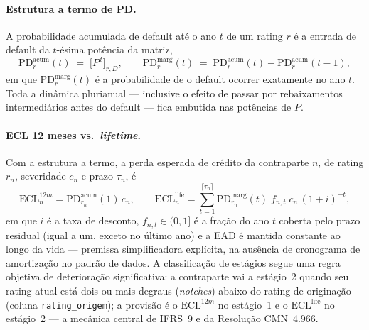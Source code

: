 \documentclass[11pt,a4paper]{article}
\begin{document}
\paragraph{Estrutura a termo de PD.} A probabilidade acumulada de default até o ano $t$ de um rating $r$ é a entrada de default da $t$-ésima potência da matriz,
\begin{equation}
\mathrm{PD}^{\mathrm{acum}}_{r}(t) \;=\; \bigl[P^{\,t}\bigr]_{r,D},
\qquad
\mathrm{PD}^{\mathrm{marg}}_{r}(t) \;=\; \mathrm{PD}^{\mathrm{acum}}_{r}(t)-\mathrm{PD}^{\mathrm{acum}}_{r}(t-1),
\label{eq:pdterm}
\end{equation}
em que $\mathrm{PD}^{\mathrm{marg}}_{r}(t)$ é a probabilidade de o default ocorrer exatamente no ano $t$. Toda a dinâmica plurianual --- inclusive o efeito de passar por rebaixamentos intermediários antes do default --- fica embutida nas potências de $P$.

\paragraph{ECL 12 meses vs.\ \emph{lifetime}.} Com a estrutura a termo, a perda esperada de crédito da contraparte $n$, de rating $r_n$, severidade $c_n$ e prazo $\tau_n$, é
\begin{equation}
\mathrm{ECL}^{12m}_n = \mathrm{PD}^{\mathrm{acum}}_{r_n}(1)\,c_n,
\qquad
\mathrm{ECL}^{\mathrm{life}}_n = \sum_{t=1}^{\lceil \tau_n\rceil} \mathrm{PD}^{\mathrm{marg}}_{r_n}(t)\;f_{n,t}\;c_n\,(1+i)^{-t},
\label{eq:ecl}
\end{equation}
em que $i$ é a taxa de desconto, $f_{n,t}\in(0,1]$ é a fração do ano $t$ coberta pelo prazo residual (igual a um, exceto no último ano) e a EAD é mantida constante ao longo da vida --- premissa simplificadora explícita, na ausência de cronograma de amortização no padrão de dados. A classificação de estágios segue uma regra objetiva de deterioração significativa: a contraparte vai a estágio~2 quando seu rating atual está dois ou mais degraus (\emph{notches}) abaixo do rating de originação (coluna \texttt{rating\_origem}); a provisão é o $\mathrm{ECL}^{12m}$ no estágio~1 e o $\mathrm{ECL}^{\mathrm{life}}$ no estágio~2 --- a mecânica central de IFRS~9 e da Resolução CMN~4.966.
\end{document}
